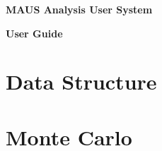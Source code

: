 \documentclass[a4paper, 10pt] {report}
\begin{document}
\vspace*{2.0cm}

\begin{center}
\Large{ \bf{MAUS Analysis User System} }

\Large{ \bf{User Guide} }
\end{center}

%

\chapter{Data Structure}


\chapter{Monte Carlo}


%
%
%
%
%

%


\end{document}
